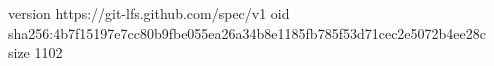 version https://git-lfs.github.com/spec/v1
oid sha256:4b7f15197e7cc80b9fbe055ea26a34b8e1185fb785f53d71cec2e5072b4ee28c
size 1102
